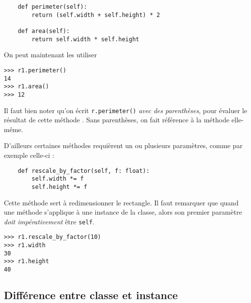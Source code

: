 \documentclass[a4paper,10pt,cours,firamath]{nsi}
\begin{document}
\begin{pyc}
    \begin{verbatim}
    def perimeter(self):
        return (self.width + self.height) * 2
    
    def area(self):
        return self.width * self.height
    \end{verbatim}
\end{pyc}


On peut maintenant les utiliser 

\begin{pyc}
    \begin{verbatim}
>>> r1.perimeter()
14
>>> r1.area()
>>> 12
    \end{verbatim}
\end{pyc}
\begin{remarque}[]
    Il faut bien noter qu'on écrit \texttt{r.perimeter()} \textit{avec des parenthèses}, pour évaluer le résultat de cette méthode . Sans parenthèses, on fait référence à la méthode elle-même.\\
\end{remarque}
D'ailleurs certaines méthodes requièrent un ou plusieurs paramètres, comme par exemple celle-ci :

\begin{pyc}
    \begin{verbatim}
    def rescale_by_factor(self, f: float):
        self.width *= f
        self.height *= f
    \end{verbatim}
\end{pyc}
Cette méthode sert à redimensionner le rectangle. Il faut remarquer que quand une méthode s'applique à une instance de la classe, alors son premier paramètre \textit{doit impérativement} être \texttt{self}.

\begin{pyc}
    \begin{verbatim}
>>> r1.rescale_by_factor(10)
>>> r1.width
30
>>> r1.height
40
        \end{verbatim}
\end{pyc}

\subsection{Différence entre classe et instance}
\end{document}
